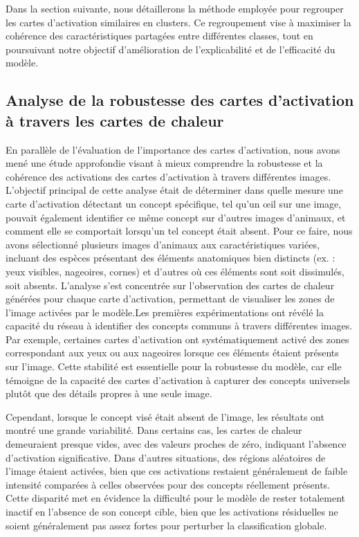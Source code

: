 \documentclass[runningheads]{llncs}
\begin{document}
Dans la section suivante, nous détaillerons la méthode employée pour regrouper les cartes d'activation similaires en clusters. Ce regroupement vise à maximiser la cohérence des caractéristiques partagées entre différentes classes, tout en poursuivant notre objectif d’amélioration de l’explicabilité et de l’efficacité du modèle.

\subsection{Analyse de la robustesse des cartes d'activation à travers les cartes de chaleur}

En parallèle de l’évaluation de l’importance des cartes d'activation, nous avons mené une étude approfondie visant à mieux comprendre la robustesse et la cohérence des activations des cartes d'activation à travers différentes images. L’objectif principal de cette analyse était de déterminer dans quelle mesure une carte d'activation détectant un concept spécifique, tel qu’un œil sur une image, pouvait également identifier ce même concept sur d’autres images d’animaux, et comment elle se comportait lorsqu’un tel concept était absent. Pour ce faire, nous avons sélectionné plusieurs images d’animaux aux caractéristiques variées, incluant des espèces présentant des éléments anatomiques bien distincts (ex. : yeux visibles, nageoires, cornes) et d’autres où ces éléments sont soit dissimulés, soit absents. L’analyse s’est concentrée sur l’observation des cartes de chaleur générées pour chaque carte d'activation, permettant de visualiser les zones de l’image activées par le modèle.Les premières expérimentations ont révélé la capacité du réseau à identifier des concepts communs à travers différentes images. Par exemple, certaines cartes d'activation ont systématiquement activé des zones correspondant aux yeux ou aux nageoires lorsque ces éléments étaient présents sur l’image. Cette stabilité est essentielle pour la robustesse du modèle, car elle témoigne de la capacité des cartes d'activation à capturer des concepts universels plutôt que des détails propres à une seule image.

Cependant, lorsque le concept visé était absent de l’image, les résultats ont montré une grande variabilité. Dans certains cas, les cartes de chaleur demeuraient presque vides, avec des valeurs proches de zéro, indiquant l’absence d’activation significative. Dans d’autres situations, des régions aléatoires de l’image étaient activées, bien que ces activations restaient généralement de faible intensité comparées à celles observées pour des concepts réellement présents. Cette disparité met en évidence la difficulté pour le modèle de rester totalement inactif en l’absence de son concept cible, bien que les activations résiduelles ne soient généralement pas assez fortes pour perturber la classification globale.
\end{document}
